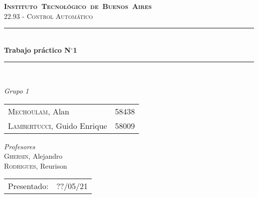 \begin{titlepage}
\newcommand{\HRule}{\rule{\linewidth}{0.5mm}}
\center
\mbox{\textsc{\LARGE \bfseries {Instituto Tecnológico de Buenos Aires}}}\\[1.5cm]
\textsc{\Large 22.93 - Control Automático}\\[0.5cm]


\HRule \\[0.6cm]
{ \Huge \bfseries Trabajo práctico N$^{\circ}$1}\\[0.4cm] 
\HRule \\[1.5cm]


{\large

\emph{Grupo 1}\\
\vspace{3pt}

\begin{tabular}{lr} 	
\textsc{Mechoulam}, Alan  &  58438\\
\textsc{Lambertucci}, Guido Enrique  & 58009 \\
\end{tabular}

\vspace{20pt}

\emph{Profesores}\\
\textsc{Ghersin}, Alejandro\\
\textsc{Rodrigues}, Reurison\\



\vspace{3pt}

\vspace{100pt}

\begin{tabular}{ll}

Presentado: & ??/05/21\\

\end{tabular}

}

\vfill

\end{titlepage}
